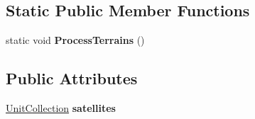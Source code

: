 \subsection*{Static Public Member Functions}
\begin{DoxyCompactItemize}
\item 
static void {\bfseries Process\+Terrains} ()\hypertarget{classPlanet_a1453df1f0b9c9c247fc283b57d439c43}{}\label{classPlanet_a1453df1f0b9c9c247fc283b57d439c43}

\end{DoxyCompactItemize}
\subsection*{Public Attributes}
\begin{DoxyCompactItemize}
\item 
\hyperlink{classUnitCollection}{Unit\+Collection} {\bfseries satellites}\hypertarget{classPlanet_a91f8075da704d3541498580a08ff02fa}{}\label{classPlanet_a91f8075da704d3541498580a08ff02fa}

\end{DoxyCompactItemize}
